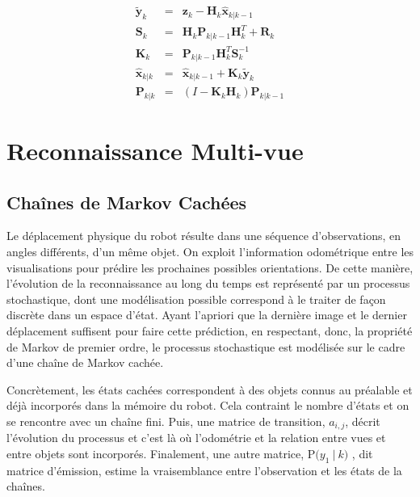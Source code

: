 \begin{equation*}
	\begin{array}{ccl}
\tilde{\textbf{y}}_{k} &=& \textbf{z}_{k} - \textbf{H}_{k}\hat{\textbf{x}}_{k|k-1} \\
\textbf{S}_{k} &=& \textbf{H}_{k}\textbf{P}_{k|k-1} \textbf{H}_{k}^{T}+\textbf{R}_{k} \\
\textbf{K}_{k} &=& \textbf{P}_{k|k-1}\textbf{H}_{k}^{T}\textbf{S}_{k}^{-1} \\
\hat{\textbf{x}}_{k|k} &=& \hat{\textbf{x}}_{k|k-1} + \textbf{K}_{k}\tilde{\textbf{y}}_{k} \\
\textbf{P}_{k|k} &=& (I - \textbf{K}_{k} \textbf{H}_{k}) \textbf{P}_{k|k-1}
	\end{array}
\end{equation*}

\section {Reconnaissance Multi-vue}

\subsection {Chaînes de Markov Cachées}

Le déplacement physique du robot résulte dans une séquence
d'observations, en angles différents, d'un même objet. On exploit
l'information odométrique entre les visualisations pour prédire les
prochaines possibles orientations. De cette manière, l'évolution de la
reconnaissance au long du temps est représenté par un processus
stochastique, dont une modélisation possible correspond à le traiter
de façon discrète dans un espace d'état. Ayant l'apriori que la
dernière image et le dernier déplacement suffisent pour faire cette
prédiction, en respectant, donc, la propriété de Markov de premier
ordre, le processus stochastique est modélisée sur le cadre d'une
chaîne de Markov cachée.

Concrètement, les états cachées correspondent à des objets connus au
préalable et déjà incorporés dans la mémoire du robot. Cela contraint le
nombre d'états et on se rencontre avec un chaîne fini. Puis, une
matrice de transition, $a_{i,j}$, décrit l'évolution du processus et c'est là où
l'odométrie et la relation entre vues et entre objets sont
incorporés. Finalement, une autre matrice, $\mathrm{P}\big( y_1 \ | \ k \big)$
, dit matrice d'émission, estime la vraisemblance entre l'observation
et les états de la chaînes.


